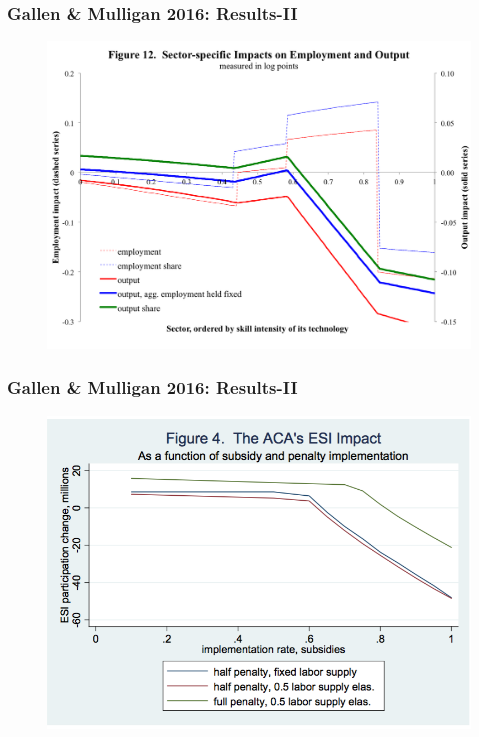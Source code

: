 \documentclass{beamer}
\begin{document}
\begin{frame}
\frametitle[alignment=center]{Gallen \& Mulligan 2016: Results-II}
\begin{figure}
\centering
\includegraphics[scale=0.42]{OutputEffects.png}
\end{figure}
\end{frame}

\begin{frame}
\frametitle[alignment=center]{Gallen \& Mulligan 2016: Results-II}
\begin{figure}
\centering
\includegraphics[scale=0.37]{ACAESIImpact.png}
\end{figure}
\end{frame}
\end{document}
